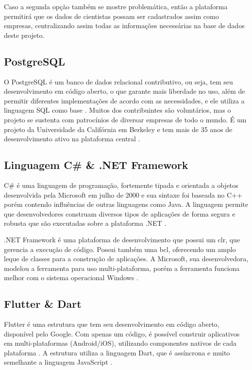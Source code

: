 Caso a segunda opção também se mostre problemática, então a plataforma permitirá que os dados de cientistas possam ser cadastrados assim como empresas, centralizando assim todas as informações necessárias na base de dados deste projeto.

\subsection{PostgreSQL}\label{subsec:postgresql}

O PostgreSQL é um banco de dados relacional contributivo, ou seja, tem seu desenvolvimento em código aberto, o que garante mais liberdade no uso, além de permitir diferentes implementações de acordo com as necessidades, e ele utiliza a linguagem SQL como base \cite{Amazon}. Muitos dos contribuintes são voluntários, mas o projeto se sustenta com patrocínios de diversar empresas de todo o mundo. É um projeto da Universidade da Califórnia em Berkeley e tem mais de 35 anos de desenvolvimento ativo na plataforma central \cite{PostgreSQL}.

\subsection{Linguagem C{\#} {\&} .NET Framework}\label{subsec:csharp}

C{\#} é uma linguagem de programação, fortemente tipada e orientada a objetos desenvolvida pela Microsoft em julho de 2000 e sua sintaxe foi baseada no C++ porém contendo influências de outras linguagens como Java. A linguagem permite que desenvolvedores construam diversos tipos de aplicações de forma segura e robusta que são executadas sobre a plataforma .NET \cite{CSharp}.

.NET Framework é uma plataforma de desenvolvimento que possui um \gls{clr}, que gerencia a execução de código. Possui também uma \gls{bcl}, oferecendo um amplo leque de classes para a construção de aplicações. A Microsoft, sua desenvolvedora, modelou a ferramenta para uso multi-plataforma, porém a ferramenta funciona melhor com o sistema operacional Windows \cite{CSharpDevelopment}.

\subsection{Flutter {\&} Dart}\label{subsec:flutterdart}

Flutter é uma estrutura que tem seu desenvolvimento em código aberto, disponível pelo Google. Com apenas um código, é possível construir aplicativos em multi-plataformas (Android/iOS), utilizando componentes nativos de cada plataforma \cite{Flutter}. A estrutura utiliza a linguagem Dart, que é assíncrona e muito semelhante a linguagem JavaScript \cite{Dart}.

